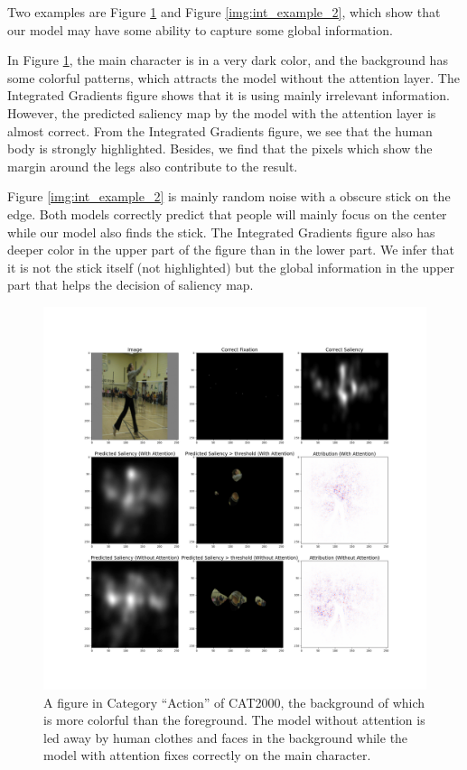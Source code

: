 \documentclass[12pt]{article}
\begin{document}
Two examples are Figure \ref{img:int_example_1} and Figure \ref{img:int_example_2}, which show that our model may have some ability to capture some global information.

In Figure \ref{img:int_example_1}, the main character is in a very dark color, and the background has some colorful patterns, which attracts the model without the attention layer. The Integrated Gradients figure shows that it is using mainly irrelevant information.
However, the predicted saliency map by the model with the attention layer is almost correct.
From the Integrated Gradients figure, we see that the human body is strongly highlighted. Besides, we find that the pixels which show the margin around the legs also contribute to the result.

Figure \ref{img:int_example_2} is mainly random noise with a obscure stick on the edge. Both models correctly predict that people will mainly focus on the center while our model also finds the stick.
The Integrated Gradients figure also has deeper color in the upper part of the figure than in the lower part. We infer that it is not the stick itself (not highlighted) but the global information in the upper part that helps the decision of saliency map.


\begin{figure}[h!]
    \begin{adjustwidth}{-1cm}{}
    \centering
    \includegraphics[width=7in]{imgs/used_example_1.png}
    \end{adjustwidth}
    \caption{A figure in Category ``Action'' of CAT2000, the background of which is more colorful than the foreground. The model without attention is led away by human clothes and faces in the background while the model with attention fixes correctly on the main character.}
    \label{img:int_example_1}
\end{figure}
\end{document}
